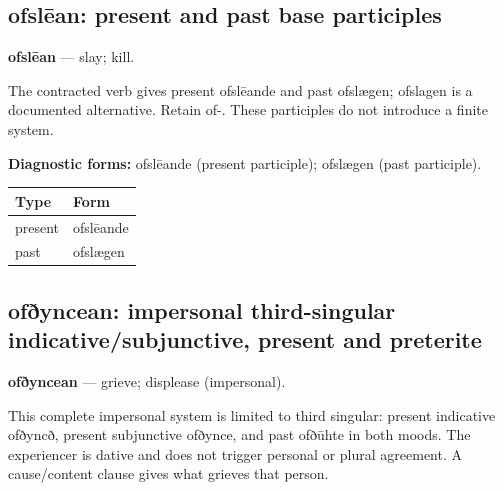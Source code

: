 \subsection*{ofslēan: present and past base participles}

\par\begin{minipage}{\linewidth}\raggedright
\textbf{ofslēan} — slay; kill.

The contracted verb gives present ofslēande and past ofslægen; ofslagen is a documented alternative. Retain of-. These participles do not introduce a finite system.

\textbf{Diagnostic forms:} ofslēande (present participle); ofslægen (past participle).

\par\begingroup
\fontsize{10.5}{13.2}\selectfont
\setlength{\LTleft}{0pt}\setlength{\LTright}{\fill}
\noindent
\begin{tabular}{@{}>{\raggedright\arraybackslash}p{60.59mm}>{\raggedright\arraybackslash}p{60.59mm}@{}}
\toprule
\textbf{Type} & \textbf{Form} \\
\midrule
present & ofslēande \\
past & ofslægen \\
\bottomrule
\end{tabular}
\par\endgroup

\end{minipage}\par
{}
\subsection*{ofðyncean: impersonal third-singular indicative/\allowbreak{}subjunctive, present and preterite}

\textbf{ofðyncean} — grieve; displease (impersonal).

This complete impersonal system is limited to third singular: present indicative ofðyncð, present subjunctive ofðynce, and past ofðūhte in both moods. The experiencer is dative and does not trigger personal or plural agreement. A cause/\allowbreak{}content clause gives what grieves that person.

